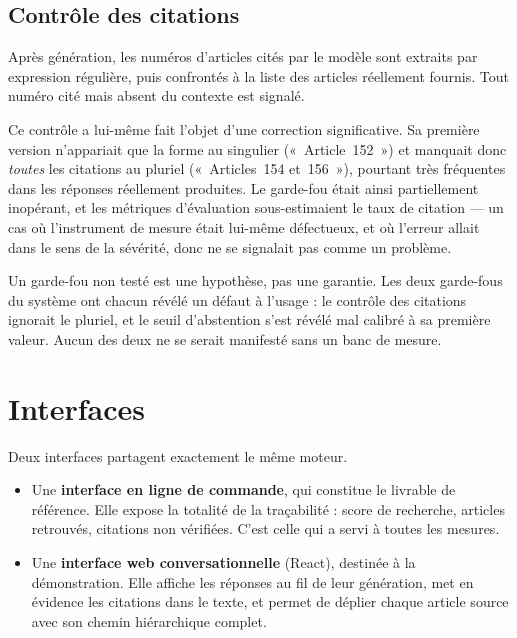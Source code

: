 \subsection{Contrôle des citations}

Après génération, les numéros d'articles cités par le modèle sont extraits par expression
régulière, puis confrontés à la liste des articles réellement fournis. Tout numéro cité mais
absent du contexte est signalé.

Ce contrôle a lui-même fait l'objet d'une correction significative. Sa première version n'appariait
que la forme au singulier («~Article~152~») et manquait donc \emph{toutes} les citations au pluriel
(«~Articles~154 et~156~»), pourtant très fréquentes dans les réponses réellement produites. Le
garde-fou était ainsi partiellement inopérant, et les métriques d'évaluation sous-estimaient le
taux de citation --- un cas où l'instrument de mesure était lui-même défectueux, et où l'erreur
allait dans le sens de la sévérité, donc ne se signalait pas comme un problème.

\begin{constat}
Un garde-fou non testé est une hypothèse, pas une garantie. Les deux garde-fous du système ont
chacun révélé un défaut à l'usage : le contrôle des citations ignorait le pluriel, et le seuil
d'abstention s'est révélé mal calibré à sa première valeur. Aucun des deux ne se serait manifesté
sans un banc de mesure.
\end{constat}

\section{Interfaces}

Deux interfaces partagent exactement le même moteur.

\begin{itemize}
  \item Une \textbf{interface en ligne de commande}, qui constitue le livrable de référence. Elle
        expose la totalité de la traçabilité : score de recherche, articles retrouvés, citations
        non vérifiées. C'est celle qui a servi à toutes les mesures.
  \item Une \textbf{interface web conversationnelle} (React), destinée à la démonstration. Elle
        affiche les réponses au fil de leur génération, met en évidence les citations dans le
        texte, et permet de déplier chaque article source avec son chemin hiérarchique complet.
\end{itemize}

